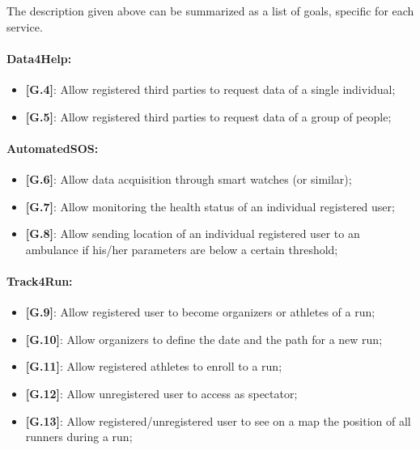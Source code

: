 The description given above can be summarized as a list of goals, specific for each service.
\paragraph{Data4Help:}
\begin{itemize}
  \item \textbf{[G.4]}: Allow registered third parties to request data of a single individual;
  \item \textbf{[G.5]}: Allow registered third parties to request data of a group of people;
\end{itemize}

\paragraph{AutomatedSOS:}
\begin{itemize}
  \item \textbf{[G.6]}: Allow data acquisition through smart watches (or similar);
  \item \textbf{[G.7]}: Allow monitoring the health status of an individual registered user;
  \item \textbf{[G.8]}: Allow sending location of an individual registered user to an ambulance if his/her parameters are below a certain threshold;
\end{itemize}

\paragraph{Track4Run:}
\begin{itemize}
  \item \textbf{[G.9]}: Allow registered user to become organizers or athletes of a run;
  \item \textbf{[G.10]}: Allow organizers to define the date and the path for a new run;
  \item \textbf{[G.11]}: Allow registered athletes to enroll to a run;
  \item \textbf{[G.12]}: Allow unregistered user to access as spectator;
  \item \textbf{[G.13]}: Allow registered/unregistered user to see on a map the position of all runners during a run;
\end{itemize}

